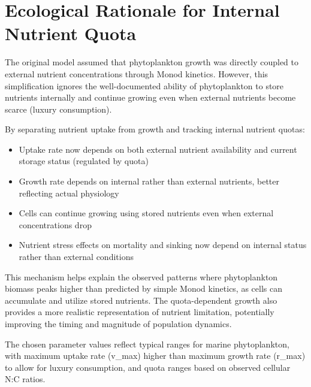 \section{Ecological Rationale for Internal Nutrient Quota}

The original model assumed that phytoplankton growth was directly coupled to external nutrient concentrations through Monod kinetics. However, this simplification ignores the well-documented ability of phytoplankton to store nutrients internally and continue growing even when external nutrients become scarce (luxury consumption).

By separating nutrient uptake from growth and tracking internal nutrient quotas:

\begin{itemize}
    \item Uptake rate now depends on both external nutrient availability and current storage status (regulated by quota)
    \item Growth rate depends on internal rather than external nutrients, better reflecting actual physiology
    \item Cells can continue growing using stored nutrients even when external concentrations drop
    \item Nutrient stress effects on mortality and sinking now depend on internal status rather than external conditions
\end{itemize}

This mechanism helps explain the observed patterns where phytoplankton biomass peaks higher than predicted by simple Monod kinetics, as cells can accumulate and utilize stored nutrients. The quota-dependent growth also provides a more realistic representation of nutrient limitation, potentially improving the timing and magnitude of population dynamics.

The chosen parameter values reflect typical ranges for marine phytoplankton, with maximum uptake rate (v\_max) higher than maximum growth rate (r\_max) to allow for luxury consumption, and quota ranges based on observed cellular N:C ratios.
